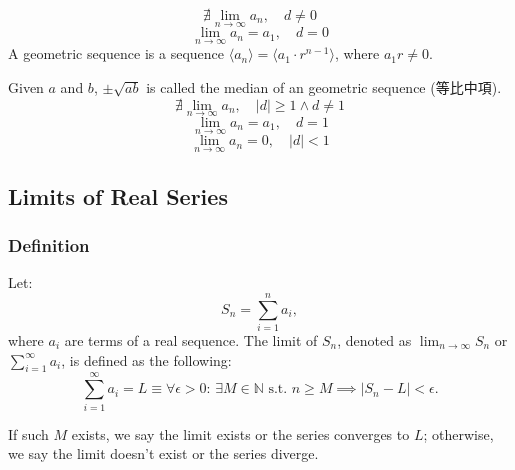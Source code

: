 \documentclass[a4paper,12pt]{report}
\begin{document}
\[\nexists\lim_{n\to\infty}a_n,\quad d\neq 0\]
\[\lim_{n\to\infty}a_n=a_1,\quad d=0\]
A geometric sequence is a sequence $\langle a_n\rangle=\langle a_1\cdot r^{n-1}\rangle$, where $a_1r\neq 0$.

Given $a$ and $b$, $\pm\sqrt{ab}$ is called the median of an geometric sequence (等比中項).
\[\nexists\lim_{n\to\infty}a_n,\quad |d|\geq 1\land d\neq 1\]
\[\lim_{n\to\infty}a_n=a_1,\quad d=1\]
\[\lim_{n\to\infty}a_n=0,\quad |d|<1\]
\subsection{Limits of Real Series}
\subsubsection{Definition}
Let:
\[S_n = \sum_{i=1}^n a_i,\]
where \(a_i\) are terms of a real sequence. The limit of \(S_n\), denoted as \(\lim_{n\to\infty}S_n\) or \(\sum_{i=1}^{\infty}a_i\), is defined as the following:
\[\sum_{i=1}^{\infty}a_i = L \equiv \forall \epsilon > 0:\, \exists M \in\mathbb{N}\text{\ s.t.\ } n \geq M\implies |S_n - L| < \epsilon.\]

If such $M$ exists, we say the limit exists or the series converges to $L$; otherwise, we say the limit doesn't exist or the series diverge.
\end{document}
